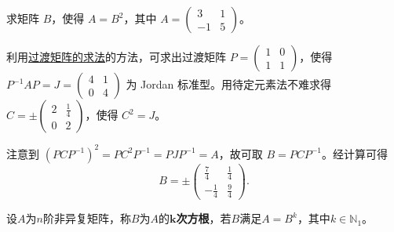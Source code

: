 \documentclass[../../main.tex]{subfiles}%
\begin{document}
\begin{example}
求矩阵 $B$，使得 $A = B^2$，其中 $A = \begin{pmatrix}
3 & 1 \\
-1 & 5
\end{pmatrix}$。
\end{example}
\begin{solution}
利用\hyperref[section:过渡矩阵的求法]{过渡矩阵的求法}的方法，可求出过渡矩阵 $P = \begin{pmatrix}
1 & 0 \\
1 & 1
\end{pmatrix}$，使得 $P^{-1}AP = J = \begin{pmatrix}
4 & 1 \\
0 & 4
\end{pmatrix}$ 为 Jordan 标准型。用待定元素法不难求得 $C = \pm\begin{pmatrix}
2 & \frac{1}{4} \\
0 & 2
\end{pmatrix}$，使得 $C^2 = J$。

注意到 $(PCP^{-1})^2 = PC^2P^{-1} = PJP^{-1} = A$，故可取 $B = PCP^{-1}$。经计算可得
\[B = \pm\begin{pmatrix}
\frac{7}{4} & \frac{1}{4} \\
-\frac{1}{4} & \frac{9}{4}
\end{pmatrix}. \]

\end{solution}

\begin{definition}
设$A$为$n$阶非异复矩阵，称$B$为$A$的\textbf{$\boldsymbol{k}$次方根}，若$B$满足$A=B^k$，其中$k\in \mathbb{N} _1$。
\end{definition}
\end{document}
